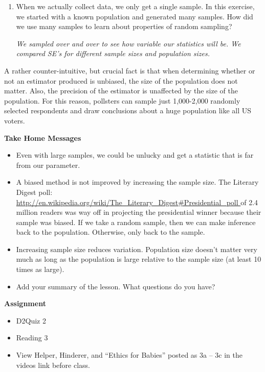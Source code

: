 \begin{enumerate}
     \item When we actually collect data, we only get a single sample.
       In this exercise, we started with a known population and
       generated many samples. How did we use many samples to learn
       about properties of random sampling?
\begin{students}
  \vspace{1.5in}
\end{students}    
\begin{key}
   {\it  We sampled over and over to see how variable our statistics
     will be.  We compared SE's for different sample sizes and
     population sizes. }
\end{key}

  \end{enumerate}

  A rather counter-intuitive, but  crucial fact is that when
  determining whether or not an estimator produced is unbiased, the
  size of the population does not matter. Also, the precision of the
  estimator is unaffected by the size of the population. For this
  reason, pollsters can  sample just 1,000-2,000 randomly selected
  respondents and draw conclusions about a huge population like all US
  voters. 

  \begin{center}
    {\bf Take Home Messages}
  \end{center}
 
  \begin{itemize}
  \item Even with large samples, we could be unlucky and get a
    statistic that is far from our parameter.
  \item A biased method is not improved by increasing the sample size.
    The Literary Digest poll:\\
    \url{http://en.wikipedia.org/wiki/The_Literary_Digest#Presidential_poll
    } of 2.4 million
    readers was way off in projecting the presidential winner because
    their sample was biased.
    If we take a random sample, then we can make inference back to the
    population. Otherwise, only back to the sample.

  \item Increasing sample size reduces variation.  Population size
    doesn't matter very  much as long as the population is large
    relative to the sample size (at least 10 times as large).
  \item Add your summary of the lesson.  What questions do you have?
  \end{itemize}\vspace{\fill}


 {\bf Assignment}
 \begin{itemize}
 \item  D2Quiz 2\\
 \item Reading 3\\
 \item View Helper, Hinderer, and ``Ethics for Babies'' posted as 3a --
   3c in the videos link before class.
 \end{itemize}

